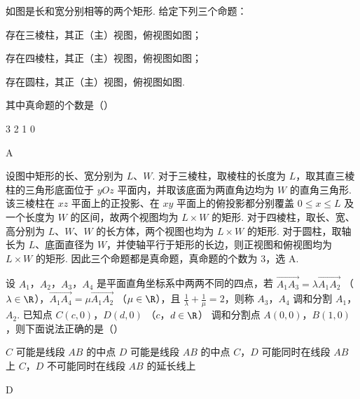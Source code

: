 \begin{problem}
如图是长和宽分别相等的两个矩形. 给定下列三个命题：
\begin{circlelist}
\item 存在三棱柱，其正（主）视图，俯视图如图；
\item 存在四棱柱，其正（主）视图，俯视图如图；
\item 存在圆柱，其正（主）视图，俯视图如图.
\end{circlelist}
其中真命题的个数是（\quad）


\choices
    {3}
    {2}
    {1}
    {0}
\end{problem}

\begin{answer}
A
\end{answer}

\begin{solution}
设图中矩形的长、宽分别为 \(L\)、\(W\). 对于三棱柱，取棱柱的长度为 \(L\)，取其直三棱柱的三角形底面位于 \(yOz\) 平面内，并取该底面为两直角边均为 \(W\) 的直角三角形. 该三棱柱在 \(xz\) 平面上的正投影、在 \(xy\) 平面上的俯投影都分别覆盖 \(0\leqslant x\leqslant L\) 及一个长度为 \(W\) 的区间，故两个视图均为 \(L\times W\) 的矩形. 对于四棱柱，取长、宽、高分别为 \(L\)、\(W\)、\(W\) 的长方体，两个视图也均为 \(L\times W\) 的矩形. 对于圆柱，取轴长为 \(L\)、底面直径为 \(W\)，并使轴平行于矩形的长边，则正视图和俯视图均为 \(L\times W\) 的矩形. 因此三个命题都是真命题，真命题的个数为 \(3\)，选 A.
\end{solution}

\begin{problem}
设 \(A_{1}\)，\(A_{2}\)，\(A_{3}\)，\(A_{4}\) 是平面直角坐标系中两两不同的四点，若 \(\overrightarrow{A_{1}A_{3}} = \lambda \overrightarrow{A_{1}A_{2}}\) （\(\lambda \in \R\)），\(\overrightarrow{A_{1}A_{4}} = \mu \overrightarrow{A_{1}A_{2}}\) （\(\mu \in \R\)），且 \(\frac{1}{\lambda} + \frac{1}{\mu} = 2\)，则称 \(A_{3}\)，\(A_{4}\) 调和分割 \(A_{1}\)，\(A_{2}\). 已知点 \(C(c, 0)\)，\(D(d, 0)\) （\(c\)，\(d \in \R\)） 调和分割点 \(A(0, 0)\)，\(B(1, 0)\)，则下面说法正确的是（\quad）

\choices
    {\(C\) 可能是线段 \(AB\) 的中点}
    {\(D\) 可能是线段 \(AB\) 的中点}
    {\(C\)，\(D\) 可能同时在线段 \(AB\) 上}
    {\(C\)，\(D\) 不可能同时在线段 \(AB\) 的延长线上}
\end{problem}

\begin{answer}
D
\end{answer}

